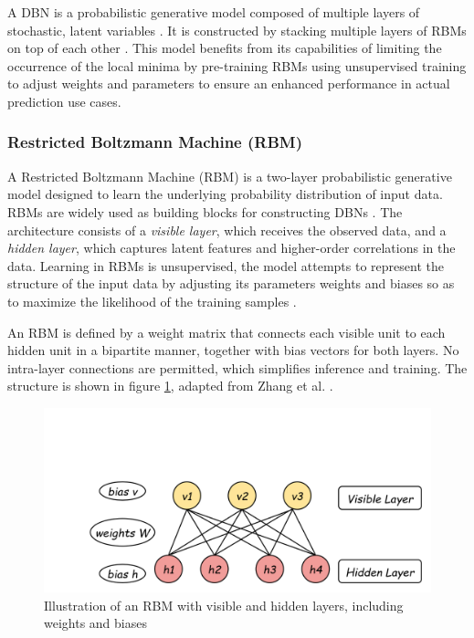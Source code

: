  A DBN is a probabilistic generative model composed of multiple layers of stochastic, latent variables \cite{zhang2017deep}. It is constructed by stacking multiple layers of RBMs on top of each other \cite{zhang2016short}. This model benefits from its capabilities of limiting the occurrence of the local minima by pre-training RBMs using unsupervised training to adjust weights and parameters to ensure an enhanced performance in actual prediction use cases.
 
\subsubsection{Restricted Boltzmann Machine (RBM)}

A Restricted Boltzmann Machine (RBM) is a two-layer probabilistic generative model designed to learn the underlying probability distribution of input data. RBMs are widely used as building blocks for constructing DBNs \cite{dong2021short}. The architecture consists of a \textit{visible layer}, which receives the observed data, and a \textit{hidden layer}, which captures latent features and higher-order correlations in the data. Learning in RBMs is unsupervised, the model attempts to represent the structure of the input data by adjusting its parameters weights and biases so as to maximize the likelihood of the training samples \cite{zhang2017deep}.

An RBM is defined by a weight matrix that connects each visible unit to each hidden unit in a bipartite manner, together with bias vectors for both layers. No intra-layer connections are permitted, which simplifies inference and training. The structure is shown in figure \ref{fig:singlerbm}, adapted from Zhang et al. \cite{zhang2017deep}.

\begin{figure}[ht]
	\centering
	\includegraphics[width=0.7\linewidth]{Chapters/images/singleRBM}
	\caption{Illustration of an RBM with visible and hidden layers, including weights and biases}
	\label{fig:singlerbm}
\end{figure}

